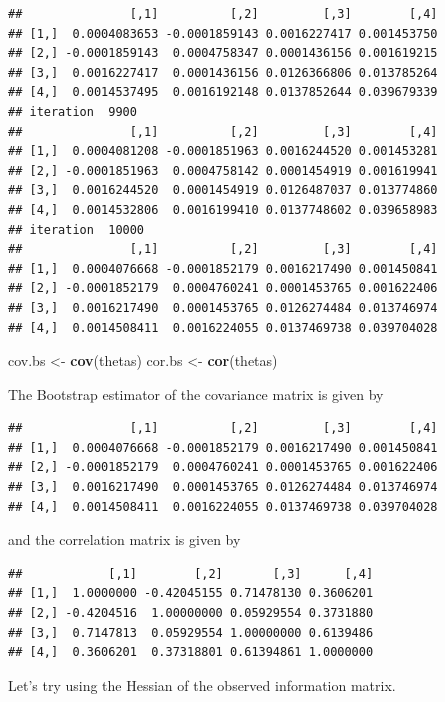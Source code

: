 \documentclass[
]{article}
\newenvironment{Shaded}{\begin{snugshade}}{\end{snugshade}}
\newcommand{\FunctionTok}[1]{\textcolor[rgb]{0.13,0.29,0.53}{\textbf{#1}}}
\newcommand{\NormalTok}[1]{#1}
\newcommand{\OtherTok}[1]{\textcolor[rgb]{0.56,0.35,0.01}{#1}}
\begin{document}
\begin{verbatim}
##               [,1]          [,2]         [,3]        [,4]
## [1,]  0.0004083653 -0.0001859143 0.0016227417 0.001453750
## [2,] -0.0001859143  0.0004758347 0.0001436156 0.001619215
## [3,]  0.0016227417  0.0001436156 0.0126366806 0.013785264
## [4,]  0.0014537495  0.0016192148 0.0137852644 0.039679339
## iteration  9900 
##               [,1]          [,2]         [,3]        [,4]
## [1,]  0.0004081208 -0.0001851963 0.0016244520 0.001453281
## [2,] -0.0001851963  0.0004758142 0.0001454919 0.001619941
## [3,]  0.0016244520  0.0001454919 0.0126487037 0.013774860
## [4,]  0.0014532806  0.0016199410 0.0137748602 0.039658983
## iteration  10000 
##               [,1]          [,2]         [,3]        [,4]
## [1,]  0.0004076668 -0.0001852179 0.0016217490 0.001450841
## [2,] -0.0001852179  0.0004760241 0.0001453765 0.001622406
## [3,]  0.0016217490  0.0001453765 0.0126274484 0.013746974
## [4,]  0.0014508411  0.0016224055 0.0137469738 0.039704028
\end{verbatim}

\begin{Shaded}
\begin{Highlighting}[]
\NormalTok{cov.bs }\OtherTok{\textless{}{-}} \FunctionTok{cov}\NormalTok{(thetas)}
\NormalTok{cor.bs }\OtherTok{\textless{}{-}} \FunctionTok{cor}\NormalTok{(thetas)}
\end{Highlighting}
\end{Shaded}

The Bootstrap estimator of the covariance matrix is given by

\begin{verbatim}
##               [,1]          [,2]         [,3]        [,4]
## [1,]  0.0004076668 -0.0001852179 0.0016217490 0.001450841
## [2,] -0.0001852179  0.0004760241 0.0001453765 0.001622406
## [3,]  0.0016217490  0.0001453765 0.0126274484 0.013746974
## [4,]  0.0014508411  0.0016224055 0.0137469738 0.039704028
\end{verbatim}

and the correlation matrix is given by

\begin{verbatim}
##            [,1]        [,2]       [,3]      [,4]
## [1,]  1.0000000 -0.42045155 0.71478130 0.3606201
## [2,] -0.4204516  1.00000000 0.05929554 0.3731880
## [3,]  0.7147813  0.05929554 1.00000000 0.6139486
## [4,]  0.3606201  0.37318801 0.61394861 1.0000000
\end{verbatim}

Let's try using the Hessian of the observed information matrix.
\end{document}
